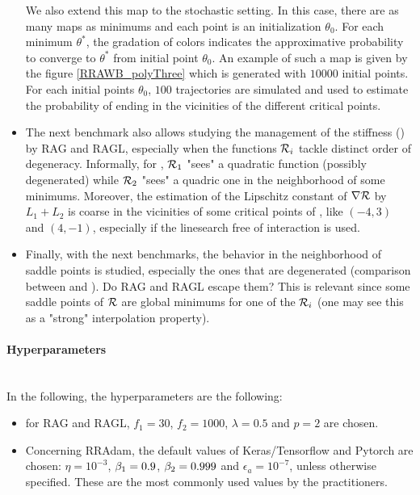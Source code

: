 \begin{itemize}
	We also extend this map to the stochastic setting. In this case, there are as many maps as minimums and each point is an initialization $\theta_0$. For each minimum
        $\theta^*$, the gradation of colors indicates the approximative probability to converge to $\theta^*$ from initial point $\theta_0$. An example of such a map is given by
        the figure \ref{RRAWB_polyThree} which is generated with $10000$ initial points.  For each initial points $\theta_0$, $100$ trajectories are simulated and used to estimate
        the probability of ending in the vicinities of the different critical points.
	\item The next benchmark also allows studying the management of the stiffness (\polyFive) by RAG and RAGL, especially when the functions $\mathcal{R}_i$ tackle distinct order of
          degeneracy. Informally, for \polyFive, $\mathcal{R}_1$ "sees" a quadratic function (possibly degenerated) while $\mathcal{R}_2$ "sees" a quadric one in the neighborhood of some minimums.
          Moreover, the estimation of the Lipschitz constant of $\nabla \mathcal{R}$ by $L_1+L_2$ is coarse in the vicinities of some critical points of \polyFive, like $(-4,3)$ and $(4,-1)$,
          especially if the linesearch free of interaction is used. 
	\item Finally, with the next benchmarks, the behavior in the neighborhood of saddle points is studied, especially the ones that are degenerated (comparison between \polyThree and \polyFive). Do RAG and RAGL escape them? This is relevant since some saddle points of $\mathcal{R}$ are global minimums for one of the $\mathcal{R}_i$ (one may see this as a "strong" interpolation property).
\end{itemize}

\paragraph{Hyperparameters}
~~\\
In the following, the hyperparameters are the following:
\begin{itemize}
	\item for RAG and RAGL, $f_1=30$, $f_2=1000$, $\lambda=0.5$ and $p=2$ are chosen. 
	\item Concerning RRAdam, the default values of Keras/Tensorflow and Pytorch are chosen: $\eta=10^{-3}$, $\beta_1=0.9$, $\beta_2=0.999$ and $\epsilon_a=10^{-7}$, unless
          otherwise specified. These are the most commonly used values by the practitioners.
\end{itemize}


